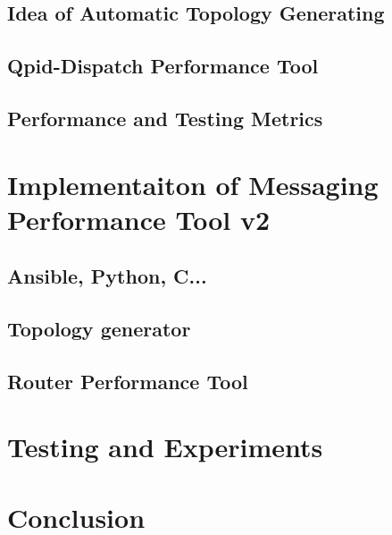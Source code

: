 \section{Idea of Automatic Topology Generating}

\section{Qpid-Dispatch Performance Tool}

\section{Performance and Testing Metrics}

\chapter{Implementaiton of Messaging Performance Tool v2}

\section{Ansible, Python, C...}

\section{Topology generator}

\section{Router Performance Tool}

\chapter{Testing and Experiments}

\chapter{Conclusion}

